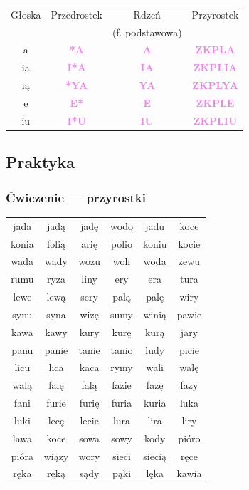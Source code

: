 \documentclass[12p, oneside]{book}
\newcommand{\steno}[1]{\textbf{\textsf{\textcolor{violet}{ #1}}}}
\begin{document}
\large
\begin{tabular}{|c|c|c|c|}
	\hline
	Głoska & Przedrostek & Rdzeń & Przyrostek \\
	& & (f. podstawowa) & \\ \hline
	a & \steno{*A} & \steno{A} & \steno{ZKPLA} \\ \hline
	ia & \steno{I*A} & \steno{IA} & \steno{ZKPLIA} \\ \hline
	ią & \steno{*YA} & \steno{YA} & \steno{ZKPLYA} \\ \hline
	e & \steno{E*} & \steno{E} & \steno{ZKPLE} \\ \hline
	iu & \steno{I*U} & \steno{IU} & \steno{ZKPLIU} \\ \hline
\end{tabular}
\normalsize

\newpage
\subsection*{Praktyka}
\label{prakt:5}

\subsubsection{Ćwiczenie --- przyrostki}

\LARGE
\begin{tabular}{c c c c c c}
	jada & jadą & jadę & wodo & jadu & koce \\ 
	konia & folią & arię & polio & koniu & kocie \\
	wada & wady & wozu & woli & woda & zewu \\
	rumu & ryza & liny & ery & era & tura \\
	lewe & lewą & sery & palą & palę & wiry \\
	synu & syna & wizę & sumy & winią & pawie \\
	kawa & kawy & kury & kurę & kurą & jary \\
	panu & panie & tanie & tanio & ludy & picie \\
	licu & lica & kaca & rymy & wali & walę \\
	walą & falę & falą & fazie & fazę & fazy \\
	fani & furie & furię & furia & kuria & luka \\
	luki & lecę & lecie & lura & lira & liry \\
	lawa & koce & sowa & sowy & kody & pióro \\
	pióra & wiązy & wory & sieci & siecią & ręce \\
	ręka & ręką & sądy & pąki & lęka & kawia \\
\end{tabular}
\end{document}
